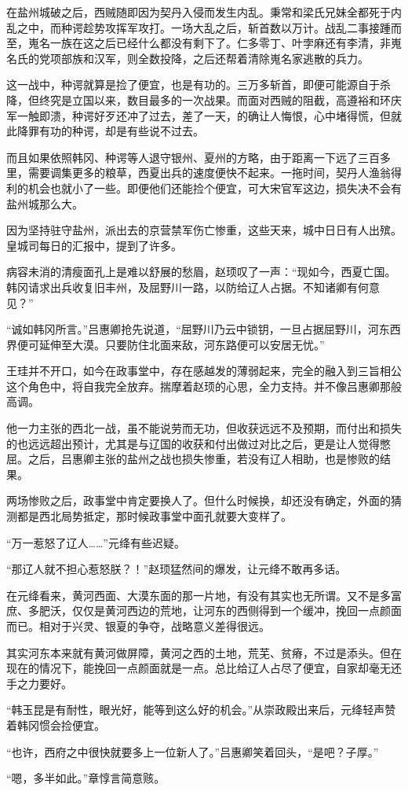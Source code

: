 在盐州城破之后，西贼随即因为契丹入侵而发生内乱。秉常和梁氏兄妹全都死于内乱之中，而种谔趁势攻挥军攻打。一场大乱之后，斩首数以万计。战乱二事接踵而至，嵬名一族在这之后已经什么都没有剩下了。仁多零丁、叶孛麻还有李清，非嵬名氏的党项部族和汉军，则全数投降，之后还帮着清除嵬名家逃散的兵力。

这一战中，种谔就算是捡了便宜，也是有功的。三万多斩首，即便可能源自于杀降，但终究是立国以来，数目最多的一次战果。而面对西贼的阻截，高遵裕和环庆军一触即溃，种谔好歹还冲了过去，差了一天，的确让人悔恨，心中堵得慌，但就此降罪有功的种谔，却是有些说不过去。

而且如果依照韩冈、种谔等人退守银州、夏州的方略，由于距离一下远了三百多里，需要调集更多的粮草，西夏出兵的速度便快不起来。一拖时间，契丹人渔翁得利的机会也就小了一些。即便他们还能捡个便宜，可大宋官军这边，损失决不会有盐州城那么大。

因为坚持驻守盐州，派出去的京营禁军伤亡惨重，这些天来，城中日日有人出殡。皇城司每日的汇报中，提到了许多。

病容未消的清瘦面孔上是难以舒展的愁眉，赵顼叹了一声：“现如今，西夏亡国。韩冈请求出兵收复旧丰州，及屈野川一路，以防给辽人占据。不知诸卿有何意见？”

“诚如韩冈所言。”吕惠卿抢先说道，“屈野川乃云中锁钥，一旦占据屈野川，河东西界便可延伸至大漠。只要防住北面来敌，河东路便可以安居无忧。”

王珪并不开口，如今在政事堂中，存在感越发的薄弱起来，完全的融入到三旨相公这个角色中，将自我完全放弃。揣摩着赵顼的心思，全力支持。并不像吕惠卿那般高调。

他一力主张的西北一战，虽不能说劳而无功，但收获远远不及预期，而付出和损失的也远远超出预计，尤其是与辽国的收获和付出做过对比之后，更是让人觉得憋屈。之后，吕惠卿主张的盐州之战也损失惨重，若没有辽人相助，也是惨败的结果。

两场惨败之后，政事堂中肯定要换人了。但什么时候换，却还没有确定，外面的猜测都是西北局势抵定，那时候政事堂中面孔就要大变样了。

“万一惹怒了辽人……”元绛有些迟疑。

“那辽人就不担心惹怒朕？！”赵顼猛然间的爆发，让元绛不敢再多话。

在元绛看来，黄河西面、大漠东面的那一片地，有没有其实也无所谓。又不是多富庶、多肥沃，仅仅是黄河西边的荒地，让河东的西侧得到一个缓冲，挽回一点颜面而已。相对于兴灵、银夏的争夺，战略意义差得很远。

其实河东本来就有黄河做屏障，黄河之西的土地，荒芜、贫瘠，不过是添头。但在现在的情况下，能挽回一点颜面就是一点。总比给辽人占尽了便宜，自家却毫无还手之力要好。

“韩玉昆是有耐性，眼光好，能等到这么好的机会。”从崇政殿出来后，元绛轻声赞着韩冈惯会捡便宜。

“也许，西府之中很快就要多上一位新人了。”吕惠卿笑着回头，“是吧？子厚。”

“嗯，多半如此。”章惇言简意赅。

